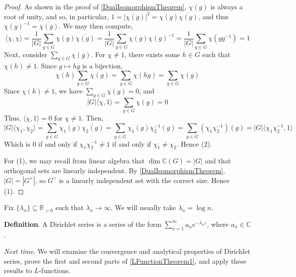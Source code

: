 \documentclass[12pt]{article}
\newcommand{\reals}{\mathbb{R}}
\newcommand{\complex}{\mathbb{C}}
\newcommand{\iprod}[2]{\langle #1, #2 \rangle}
\numberwithin{equation}{section}
\numberwithin{thm}{section}
\numberwithin{lemma}{section}
\begin{document}
\begin{proof}
  As shown in the proof of \ref{DualIsomorphismTheorem}, $\chi(g)$ is always a root of unity, and so, in particular, $1 = |\chi(g)|^2 = \chi(g) \overline{\chi(g)}$, and thus $\chi(g)^{-1} = \overline{\chi(g)}$. We may then compute, \begin{equation*}
    \iprod{\chi}{\chi} = \frac{1}{|G|} \sum_{g \in G} \chi(g) \overline{\chi(g)} = \frac{1}{|G|} \sum_{g \in G} \chi(g) \chi(g)^{-1} = \frac{1}{|G|} \sum_{g \in G} \chi(gg^{-1}) = 1
  \end{equation*} Next, consider $\sum_{g \in G} \chi(g)$. For $\chi \ne 1$, there exists some $h \in G$ such that $\chi(h) \ne 1$. Since $g \mapsto hg$ is a bijection, \begin{equation*}
    \chi(h) \sum_{g \in G} \chi(g) = \sum_{g \in G} \chi(hg) = \sum_{g \in G} \chi(g)
  \end{equation*} Since $\chi(h) \ne 1$, we have $\sum_{g \in G} \chi(g) = 0$, and \begin{equation*}
    |G| \iprod{\chi}{1} = \sum_{g \in G} \chi(g) = 0
  \end{equation*} Thus, $\iprod{\chi}{1} = 0$ for $\chi \ne 1$. Then, \begin{equation*}
    |G| \iprod{\chi_1}{\chi_2} = \sum_{g \in G} \chi_1(g) \overline{\chi_2(g)} = \sum_{g \in G} \chi_1(g) \chi_2^{-1} (g) = \sum_{g \in G} (\chi_1 \chi_2^{-1})(g) = |G| \iprod{\chi_1 \chi_2^{-1}}{1}
  \end{equation*} Which is $0$ if and only if $\chi_1\chi_2^{-1} \ne 1$ if and only if $\chi_1 \ne \chi_2$. Hence (2).

  For (1), we may recall from linear algebra that $\dim \complex(G) = |G|$ and that orthogonal sets are linearly independent. By \ref{DualIsomorphismTheorem}, $|G| = |G^{\vee}|$, so $G^{\vee}$ is a linearly independent set with the correct size. Hence (1).
\end{proof}

Fix $\{ \lambda_n \} \subseteq \reals_{> 0}$ such that $\lambda_n \to \infty$. We will usually take $\lambda_n = \log n$. 

\textbf{Definition}. A Dirichlet series is a series of the form $\sum_{n = 1}^{\infty} a_n e^{- \lambda_n z}$, where $a_n \in \complex$.

\textit{Next time}. We will examine the convergence and analytical properties of Dirichlet series, prove the first and second parts of \ref{LFunctionTheorem1}, and apply these results to $L$-functions.
\end{document}
